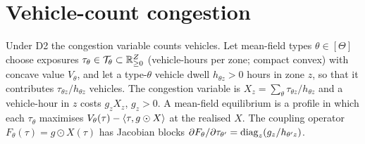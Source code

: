 \section{Vehicle-count congestion}\label{sec:d2}

Under D2 the congestion variable counts vehicles. Let mean-field types $\theta\in[\Theta]$ choose exposures $\tau_\theta\in\mathcal T_\theta\subset\mathbb{R}^Z_{\ge0}$ (vehicle-hours per zone; compact convex) with concave value $V_\theta$, and let a type-$\theta$ vehicle dwell $h_{\theta z}>0$ hours in zone $z$, so that it contributes $\tau_{\theta z}/h_{\theta z}$ vehicles. The congestion variable is $X_z=\sum_\theta\tau_{\theta z}/h_{\theta z}$ and a vehicle-hour in $z$ costs $g_zX_z$, $g_z>0$. A mean-field equilibrium is a profile in which each $\tau_\theta$ maximises $V_\theta(\tau)-\langle \tau,g\odot X\rangle$ at the realised $X$. The coupling operator $F_\theta(\tau)=g\odot X(\tau)$ has Jacobian blocks $\partial F_\theta/\partial\tau_{\theta'}=\operatorname{diag}_z(g_z/h_{\theta'z})$.

